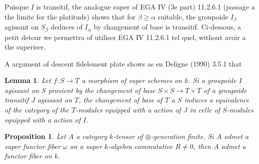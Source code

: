 \documentclass[11pt,a4paper]{article}
\theoremstyle{plain}
\newtheorem{lemma}[theorem]{Lemma}
\newtheorem{proposition}[theorem]{Proposition}
\theoremstyle{definition}
\begin{document}
Puisque $I$ is transitif, the analogue super of EGA IV (3e part) 11.2.6.1 (passage a the limite for the platitude) shows that for $\beta\geq\alpha$ suitable, the groupoide $I_\beta$ agissant on $S_\beta$ deduces of $I_\alpha$ by changement of base is transitif. Ci-dessous, a petit detour we permettra of utiliser EGA IV 11.2.6.1 tel quel, without avoir a the superiser.

A argument of descent fidelement plate shows as en Deligne (1990) 3.5.1 that

\begin{lemma}\label{4.4}
Let $f:S\to T$ a morphism of super schemes on $k$. Si a groupoide $I$ agissant on $S$ provient by the changement of base $S\times S\to T\times T$ of a groupoide transitif $J$ agissant on $T$, the changement of base of $T$ a $S$ induces a equivalence of the category of the $T$-modules equipped with a action of $J$ in celle of $S$-modules equipped with a action of $I$.
\end{lemma}

\begin{proposition}\label{4.5}
Let $A$ a category $k$-tensor of $\otimes$-generation finite. Si $A$ admet a super functor fiber $\omega$ on a super $k$-algebra commutative $R\neq0$, then $A$ admet a functor fiber on $k$.
\end{proposition}
\end{document}
